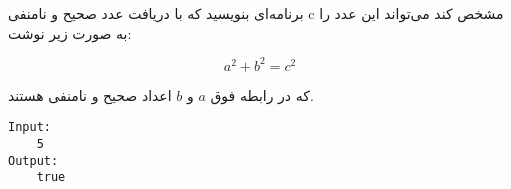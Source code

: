 \documentclass[../main.tex]{subfiles}
\begin{document}

برنامه‌ای بنویسید که با دریافت عدد صحیح و نامنفی c مشخص کند می‌تواند این عدد را به صورت زیر نوشت:

\[
  a^{2} + b^{2} = c^{2}
\]

که در رابطه فوق $a$ و $b$ اعداد صحیح و نامنفی هستند.

\begin{latin}
\begin{verbatim}
Input:
    5
Output:
    true
\end{verbatim}
\end{latin}
\end{document}
